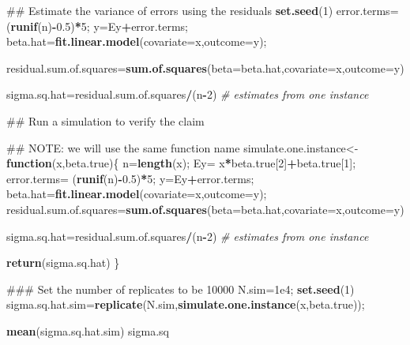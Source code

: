 \documentclass[12pt,]{book}
\newenvironment{Shaded}{\begin{snugshade}}{\end{snugshade}}
\newcommand{\KeywordTok}[1]{\textcolor[rgb]{0.13,0.29,0.53}{\textbf{#1}}}
\newcommand{\DataTypeTok}[1]{\textcolor[rgb]{0.13,0.29,0.53}{#1}}
\newcommand{\DecValTok}[1]{\textcolor[rgb]{0.00,0.00,0.81}{#1}}
\newcommand{\FloatTok}[1]{\textcolor[rgb]{0.00,0.00,0.81}{#1}}
\newcommand{\StringTok}[1]{\textcolor[rgb]{0.31,0.60,0.02}{#1}}
\newcommand{\CommentTok}[1]{\textcolor[rgb]{0.56,0.35,0.01}{\textit{#1}}}
\newcommand{\ControlFlowTok}[1]{\textcolor[rgb]{0.13,0.29,0.53}{\textbf{#1}}}
\newcommand{\OperatorTok}[1]{\textcolor[rgb]{0.81,0.36,0.00}{\textbf{#1}}}
\newcommand{\AlertTok}[1]{\textcolor[rgb]{0.94,0.16,0.16}{#1}}
\newcommand{\NormalTok}[1]{#1}
\begin{document}
\begin{Shaded}
\begin{Highlighting}[]
\NormalTok{## Estimate the variance of errors using the residuals }
\KeywordTok{set.seed}\NormalTok{(}\DecValTok{1}\NormalTok{)}
\NormalTok{error.terms=}\StringTok{ }\NormalTok{(}\KeywordTok{runif}\NormalTok{(n)}\OperatorTok{-}\FloatTok{0.5}\NormalTok{)}\OperatorTok{*}\DecValTok{5}\NormalTok{;}
\NormalTok{y=Ey}\OperatorTok{+}\NormalTok{error.terms;}
\NormalTok{beta.hat=}\KeywordTok{fit.linear.model}\NormalTok{(}\DataTypeTok{covariate=}\NormalTok{x,}\DataTypeTok{outcome=}\NormalTok{y);}

\NormalTok{residual.sum.of.squares=}\KeywordTok{sum.of.squares}\NormalTok{(}\DataTypeTok{beta=}\NormalTok{beta.hat,}\DataTypeTok{covariate=}\NormalTok{x,}\DataTypeTok{outcome=}\NormalTok{y)}

\NormalTok{sigma.sq.hat=residual.sum.of.squares}\OperatorTok{/}\NormalTok{(n}\OperatorTok{-}\DecValTok{2}\NormalTok{) }\CommentTok{# estimates from one instance}

\NormalTok{## Run a simulation to verify the claim}

\NormalTok{## }\AlertTok{NOTE}\NormalTok{: we will use the same function name}
\NormalTok{simulate.one.instance<-}\ControlFlowTok{function}\NormalTok{(x,beta.true)\{}
\NormalTok{  n=}\KeywordTok{length}\NormalTok{(x);}
\NormalTok{  Ey=}\StringTok{ }\NormalTok{x}\OperatorTok{*}\NormalTok{beta.true[}\DecValTok{2}\NormalTok{]}\OperatorTok{+}\NormalTok{beta.true[}\DecValTok{1}\NormalTok{];}
\NormalTok{  error.terms=}\StringTok{ }\NormalTok{(}\KeywordTok{runif}\NormalTok{(n)}\OperatorTok{-}\FloatTok{0.5}\NormalTok{)}\OperatorTok{*}\DecValTok{5}\NormalTok{;}
\NormalTok{  y=Ey}\OperatorTok{+}\NormalTok{error.terms;}
\NormalTok{  beta.hat=}\KeywordTok{fit.linear.model}\NormalTok{(}\DataTypeTok{covariate=}\NormalTok{x,}\DataTypeTok{outcome=}\NormalTok{y);}
\NormalTok{  residual.sum.of.squares=}\KeywordTok{sum.of.squares}\NormalTok{(}\DataTypeTok{beta=}\NormalTok{beta.hat,}\DataTypeTok{covariate=}\NormalTok{x,}\DataTypeTok{outcome=}\NormalTok{y)}

\NormalTok{sigma.sq.hat=residual.sum.of.squares}\OperatorTok{/}\NormalTok{(n}\OperatorTok{-}\DecValTok{2}\NormalTok{) }\CommentTok{# estimates from one instance}

  \KeywordTok{return}\NormalTok{(sigma.sq.hat)}
\NormalTok{\}}

\NormalTok{### Set the number of replicates to be 10000}
\NormalTok{N.sim=}\FloatTok{1e4}\NormalTok{;}
\KeywordTok{set.seed}\NormalTok{(}\DecValTok{1}\NormalTok{)}
\NormalTok{sigma.sq.hat.sim=}\KeywordTok{replicate}\NormalTok{(N.sim,}\KeywordTok{simulate.one.instance}\NormalTok{(x,beta.true));}

\KeywordTok{mean}\NormalTok{(sigma.sq.hat.sim)}
\NormalTok{sigma.sq}
\end{Highlighting}
\end{Shaded}
\end{document}
